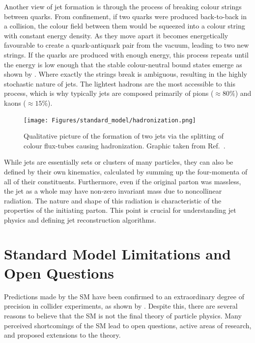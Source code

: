Another view of jet formation is through the process of breaking colour strings between quarks.
From confinement, if two quarks were produced back-to-back in a collision, the colour field between them would be squeezed into a colour string with constant energy density.
As they move apart it becomes energetically favourable to create a quark-antiquark pair from the vacuum, leading to two new strings.
If the quarks are produced with enough energy, this process repeats until the energy is low enough that the stable colour-neutral bound states emerge as shown by .
Where exactly the strings break is ambiguous, resulting in the highly stochastic nature of jets.
The lightest hadrons are the most accessible to this process, which is why typically jets are composed primarily of pions ($\approx80\%$) and kaons ($\approx15\%$).

\begin{figure}[h]
    \centering
    \texttt{[image: Figures/standard\_model/hadronization.png]}
    \caption{Qualitative picture of the formation of two jets via the splitting of colour flux-tubes causing hadronization. Graphic taken from Ref.~\cite{ModernParticlePhysics}.}
    \label{fig:hadronization}
\end{figure}

While jets are essentially sets or clusters of many particles, they can also be defined by their own kinematics, calculated by summing up the four-momenta of all of their constituents.
Furthermore, even if the original parton was massless, the jet as a whole may have non-zero invariant mass due to noncollinear radiation.
The nature and shape of this radiation is characteristic of the properties of the initiating parton.
This point is crucial for understanding jet physics and defining jet reconstruction algorithms.

\section{Standard Model Limitations and Open Questions}
\label{sec:sm_limitations}

Predictions made by the SM have been confirmed to an extraordinary degree of precision in collider experiments, as shown by .
Despite this, there are several reasons to believe that the SM is not the final theory of particle physics.
Many perceived shortcomings of the SM lead to open questions, active areas of research, and proposed extensions to the theory.

